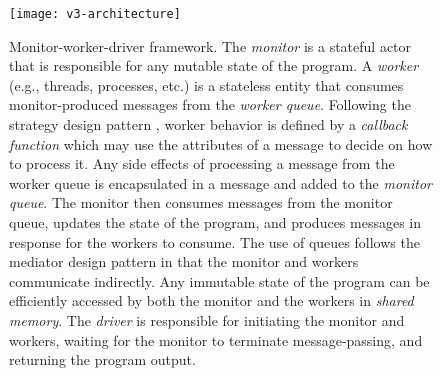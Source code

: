 \begin{figure}[htbp]
\centering
\texttt{[image: v3-architecture]}
\caption[Monitor-worker-driver framework]{Monitor-worker-driver framework.
The \emph{monitor} is a stateful actor that is responsible for any mutable state of the program. A \emph{worker} (e.g., threads, processes, etc.) is a stateless entity that consumes monitor-produced messages from the \emph{worker queue}. Following the strategy design pattern \cite{Gamma1994}, worker behavior is defined by a \emph{callback function} which may use the attributes of a message to decide on how to process it. Any side effects of processing a message from the worker queue is encapsulated in a message and added to the \emph{monitor queue}. The monitor then consumes messages from the monitor queue, updates the state of the program, and produces messages in response for the workers to consume. The use of queues follows the mediator design pattern \cite{Gamma1994} in that the monitor and workers communicate indirectly. Any immutable state of the program can be efficiently accessed by both the monitor and the workers in \emph{shared memory}. The \emph{driver} is responsible for initiating the monitor and workers, waiting for the monitor to terminate message-passing, and returning the program output.}
\label{fig:v3-architecture}
\end{figure}

